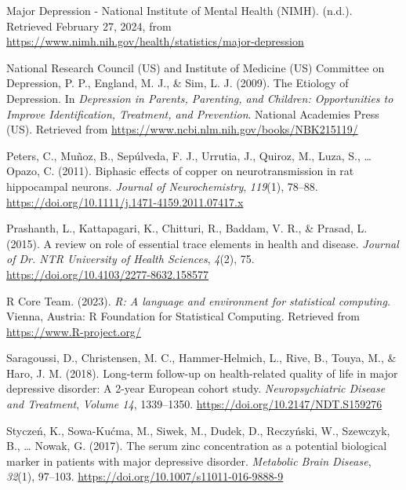 \documentclass[
  man]{apa6}
\newlength{\cslhangindent}
\newlength{\cslentryspacingunit} %
\newenvironment{CSLReferences}[2] %
 {%
  \setlength{\parindent}{0pt}
  \ifodd #1
  \let\oldpar\par
  \def\par{\hangindent=\cslhangindent\oldpar}
  \fi
  \setlength{\parskip}{#2\cslentryspacingunit}
 }%
 {}
\begin{document}
\begin{CSLReferences}{1}{0}
\leavevmode{}%
Major {Depression} - {National Institute} of {Mental Health} ({NIMH}). (n.d.). Retrieved February 27, 2024, from \url{https://www.nimh.nih.gov/health/statistics/major-depression}

\leavevmode{}%
National Research Council (US) and Institute of Medicine (US) Committee on Depression, P. P., England, M. J., \& Sim, L. J. (2009). The {Etiology} of {Depression}. In \emph{Depression in {Parents}, {Parenting}, and {Children}: {Opportunities} to {Improve Identification}, {Treatment}, and {Prevention}}. {National Academies Press (US)}. Retrieved from \url{https://www.ncbi.nlm.nih.gov/books/NBK215119/}

\leavevmode{}%
Peters, C., Muñoz, B., Sepúlveda, F. J., Urrutia, J., Quiroz, M., Luza, S., \ldots{} Opazo, C. (2011). Biphasic effects of copper on neurotransmission in rat hippocampal neurons. \emph{Journal of Neurochemistry}, \emph{119}(1), 78--88. \url{https://doi.org/10.1111/j.1471-4159.2011.07417.x}

\leavevmode{}%
Prashanth, L., Kattapagari, K., Chitturi, R., Baddam, V. R., \& Prasad, L. (2015). A review on role of essential trace elements in health and disease. \emph{Journal of Dr. NTR University of Health Sciences}, \emph{4}(2), 75. \url{https://doi.org/10.4103/2277-8632.158577}

\leavevmode{}%
R Core Team. (2023). \emph{R: A language and environment for statistical computing}. Vienna, Austria: R Foundation for Statistical Computing. Retrieved from \url{https://www.R-project.org/}

\leavevmode{}%
Saragoussi, D., Christensen, M. C., Hammer-Helmich, L., Rive, B., Touya, M., \& Haro, J. M. (2018). Long-term follow-up on health-related quality of life in major depressive disorder: A 2-year {European} cohort study. \emph{Neuropsychiatric Disease and Treatment}, \emph{Volume 14}, 1339--1350. \url{https://doi.org/10.2147/NDT.S159276}

\leavevmode{}%
Styczeń, K., Sowa-Kućma, M., Siwek, M., Dudek, D., Reczyński, W., Szewczyk, B., \ldots{} Nowak, G. (2017). The serum zinc concentration as a potential biological marker in patients with major depressive disorder. \emph{Metabolic Brain Disease}, \emph{32}(1), 97--103. \url{https://doi.org/10.1007/s11011-016-9888-9}


\end{CSLReferences}
\end{document}
